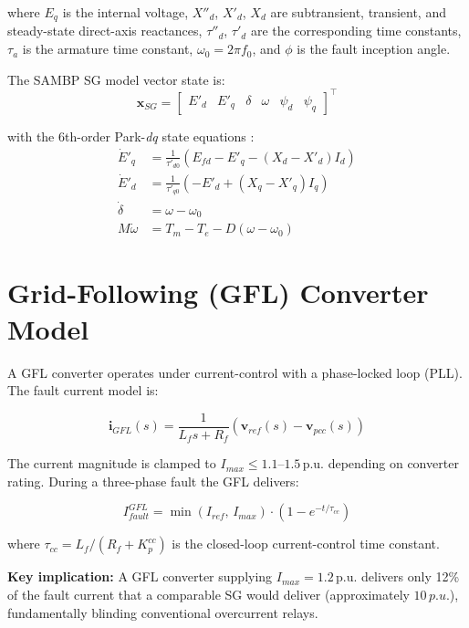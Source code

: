 \documentclass[11pt,a4paper]{report}
\newcommand{\pu}{p.u.}
\newcommand{\bvec}[1]{\mathbf{#1}}
\begin{document}
where $E_q$ is the internal voltage, $X''_d$, $X'_d$, $X_d$ are subtransient, transient, and steady-state direct-axis reactances, $\tau''_d$, $\tau'_d$ are the corresponding time constants, $\tau_a$ is the armature time constant, $\omega_0=2\pi f_0$, and $\phi$ is the fault inception angle.

The SAMBP SG model vector state is:
\begin{equation}
\bvec{x}_{SG} = \begin{bmatrix} E'_d & E'_q & \delta & \omega & \psi_d & \psi_q \end{bmatrix}^\top
\end{equation}

with the 6th-order Park-\textit{dq} state equations \cite{kundur1994}:
\begin{align}
\dot{E}'_q &= \frac{1}{\tau'_{d0}}\left(E_{fd} - E'_q - (X_d - X'_d)I_d\right) \label{eq:park1}\\
\dot{E}'_d &= \frac{1}{\tau'_{q0}}\left(-E'_d + (X_q - X'_q)I_q\right) \label{eq:park2}\\
\dot{\delta} &= \omega - \omega_0 \label{eq:park3}\\
M\dot{\omega} &= T_m - T_e - D(\omega-\omega_0) \label{eq:park4}
\end{align}

\section{Grid-Following (GFL) Converter Model}

A GFL converter operates under current-control with a phase-locked loop (PLL). The fault current model is:

\begin{equation}
\label{eq:gfl_fault}
\bvec{i}_{GFL}(s) = \frac{1}{L_f s + R_f}\left(\bvec{v}_{ref}(s) - \bvec{v}_{pcc}(s)\right)
\end{equation}

The current magnitude is clamped to $I_{max} \leq 1.1$--$1.5$\,\pu{} depending on converter rating. During a three-phase fault the GFL delivers:

\begin{equation}
\label{eq:gfl_current}
I_{fault}^{GFL} = \min\!\left(I_{ref},\,I_{max}\right)\cdot\left(1 - e^{-t/\tau_{cc}}\right)
\end{equation}

where $\tau_{cc} = L_f/(R_f + K_p^{cc})$ is the closed-loop current-control time constant.

\textbf{Key implication:} A GFL converter supplying $I_{max}=1.2$\,\pu{} delivers only 12\% of the fault current that a comparable SG would deliver (approximately $10\,\pu$), fundamentally blinding conventional overcurrent relays.
\end{document}
